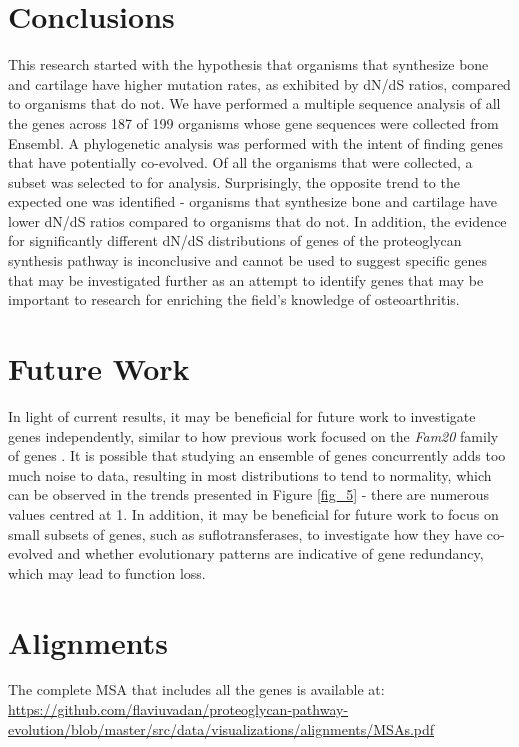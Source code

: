 \documentclass{article}
\begin{document}
\section*{Conclusions}
This research started with the hypothesis that organisms that synthesize bone and cartilage have higher mutation rates, as exhibited by dN/dS ratios, compared to organisms that do not. We have performed a multiple sequence analysis of all the genes across 187 of 199 organisms whose gene sequences were collected from Ensembl. A phylogenetic analysis was performed with the intent of finding genes that have potentially co-evolved. Of all the organisms that were collected, a subset was selected to for analysis. Surprisingly, the opposite trend to the expected one was identified - organisms that synthesize bone and cartilage have lower dN/dS ratios compared to organisms that do not. In addition, the evidence for significantly different dN/dS distributions of genes of the proteoglycan synthesis pathway is inconclusive and cannot be used to suggest specific genes that may be investigated further as an attempt to identify genes that may be important to research for enriching the field's knowledge of osteoarthritis. 

\section*{Future Work}
In light of current results, it may be beneficial for future work to investigate genes independently, similar to how previous work focused on the \textit{Fam20} family of genes \cite{fam20}. It is possible that studying an ensemble of genes concurrently adds too much noise to data, resulting in most distributions to tend to normality, which can be observed in the trends presented in Figure \ref{fig_5} - there are numerous values centred at 1. In addition, it may be beneficial for future work to focus on small subsets of genes, such as suflotransferases, to investigate how they have co-evolved and whether evolutionary patterns are indicative of gene redundancy, which may lead to function loss. 




\appendix

\section{Alignments}
The complete MSA that includes all the genes is available at: \url{https://github.com/flaviuvadan/proteoglycan-pathway-evolution/blob/master/src/data/visualizations/alignments/MSAs.pdf}
\end{document}
